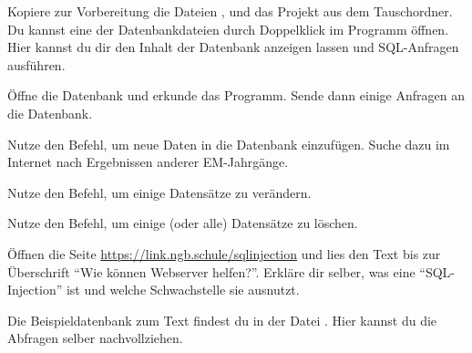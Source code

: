 \documentclass[10pt, a4paper, ngerman]{arbeitsblatt}
\begin{document}
\ReiheTitel

Kopiere zur Vorbereitung die Dateien ,  und das Projekt  aus dem Tauschordner. Du kannst eine der Datenbankdateien durch Doppelklick im Programm  öffnen. Hier kannst du dir den Inhalt der Datenbank anzeigen lassen und SQL-Anfragen ausführen.

\begin{aufgabe}[icon=\iconPartner\,\iconLaptop]
	\begin{teilaufgaben}
		\teilaufgabe
		Öffne die Datenbank  und erkunde das Programm. Sende dann einige  Anfragen an die Datenbank.

		\teilaufgabe
		Nutze den  Befehl, um neue Daten in die Datenbank einzufügen. Suche dazu im Internet nach Ergebnissen anderer EM-Jahrgänge.

		\teilaufgabe
		Nutze den  Befehl, um einige Datensätze zu verändern.

		\teilaufgabe
		Nutze den  Befehl, um einige (oder alle) Datensätze zu löschen.
	\end{teilaufgaben}


\end{aufgabe}

\begin{aufgabe}[icon=\iconPartner\,\iconLaptop]
	Öffnen die Seite \url{https://link.ngb.schule/sqlinjection} und lies den Text bis zur Überschrift \enquote{Wie können Webserver helfen?}. Erkläre dir selber, was eine \enquote{SQL-Injection} ist und welche Schwachstelle sie ausnutzt.

	Die Beispieldatenbank zum Text findest du in der Datei . Hier kannst du die Abfragen selber nachvollziehen.

\end{aufgabe}
\end{document}
